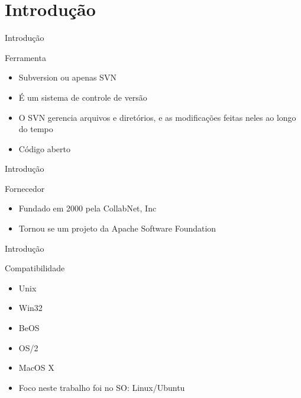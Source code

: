 \section{Introdução}

\begin{frame}{Introdução}{}
\begin{block}{Ferramenta}
  \begin{itemize}
    \item<1-> Subversion ou apenas SVN
    \item<1-> É um sistema de controle de versão
    \item<1-> O SVN gerencia arquivos e diretórios, e as modificações feitas neles ao longo do tempo
    \item<1-> Código aberto
  \end{itemize}
\end{block}
\end{frame}

\begin{frame}{Introdução}{}
\begin{block}{Fornecedor}
  \begin{itemize}
    \item<1-> Fundado em 2000 pela CollabNet, Inc
    \item<2-> Tornou se um projeto da Apache Software Foundation
  \end{itemize}
\end{block}
\end{frame}

\begin{frame}{Introdução}
\begin{block}{Compatibilidade}
  \begin{itemize}
    \item<1-> Unix
    \item<1-> Win32
    \item<1-> BeOS
    \item<1-> OS/2
    \item<1-> MacOS X
    
    \item<2-> Foco neste trabalho foi no SO: Linux/Ubuntu
  \end{itemize}
\end{block}
\end{frame}
